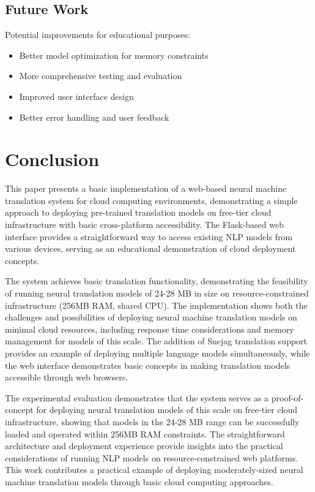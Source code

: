 \documentclass[conference]{IEEEtran}
\begin{document}
\subsection{Future Work}

Potential improvements for educational purposes:

\begin{itemize}
    \item Better model optimization for memory constraints
    \item More comprehensive testing and evaluation
    \item Improved user interface design
    \item Better error handling and user feedback
\end{itemize}

\section{Conclusion}

This paper presents a basic implementation of a web-based neural machine translation system for cloud computing environments, demonstrating a simple approach to deploying pre-trained translation models on free-tier cloud infrastructure with basic cross-platform accessibility. The Flask-based web interface provides a straightforward way to access existing NLP models from various devices, serving as an educational demonstration of cloud deployment concepts.

The system achieves basic translation functionality, demonstrating the feasibility of running neural translation models of 24-28 MB in size on resource-constrained infrastructure (256MB RAM, shared CPU). The implementation shows both the challenges and possibilities of deploying neural machine translation models on minimal cloud resources, including response time considerations and memory management for models of this scale. The addition of Snejag translation support provides an example of deploying multiple language models simultaneously, while the web interface demonstrates basic concepts in making translation models accessible through web browsers.

The experimental evaluation demonstrates that the system serves as a proof-of-concept for deploying neural translation models of this scale on free-tier cloud infrastructure, showing that models in the 24-28 MB range can be successfully loaded and operated within 256MB RAM constraints. The straightforward architecture and deployment experience provide insights into the practical considerations of running NLP models on resource-constrained web platforms. This work contributes a practical example of deploying moderately-sized neural machine translation models through basic cloud computing approaches.
\end{document}
